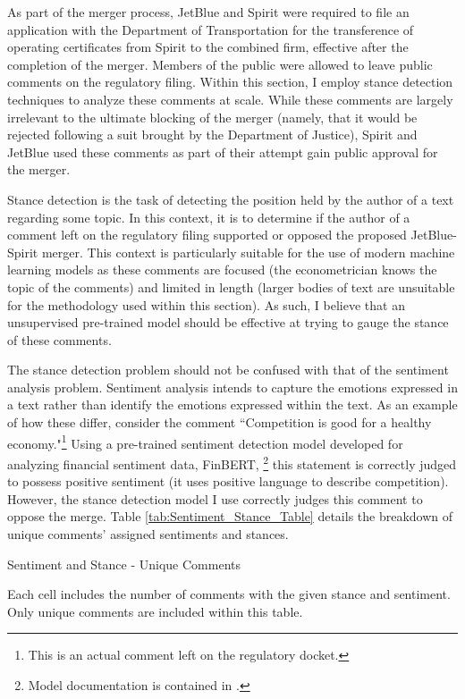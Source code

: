\documentclass{article}
\begin{document}
\begin{appendices}
As part of the merger process, JetBlue and Spirit were required to file an application with the Department of Transportation for the transference of operating certificates from Spirit to the combined firm, effective after the completion of the merger. Members of the public were allowed to leave public comments on the regulatory filing. Within this section, I employ stance detection techniques to analyze these comments at scale. While these comments are largely irrelevant to the ultimate blocking of the merger (namely, that it would be rejected following a suit brought by the Department of Justice), Spirit and JetBlue used these comments as part of their attempt gain public approval for the merger.

Stance detection is the task of detecting the position held by the author of a text regarding some topic. In this context, it is to determine if the author of a comment left on the regulatory filing supported or opposed the proposed JetBlue-Spirit merger. This context is particularly suitable for the use of modern machine learning models as these comments are focused (the econometrician knows the topic of the comments) and limited in length (larger bodies of text are unsuitable for the methodology used within this section). As such, I believe that an unsupervised pre-trained model should be effective at trying to gauge the stance of these comments. 

The stance detection problem should not be confused with that of the sentiment analysis problem. Sentiment analysis intends to capture the emotions expressed in a text rather than identify the emotions expressed within the text. As an example of how these differ, consider the comment ``Competition is good for a healthy economy."\footnote{This is an actual comment left on the regulatory docket.} Using a pre-trained sentiment detection model developed for analyzing financial sentiment data, FinBERT, \footnote{Model documentation is contained in \citet{araci_finbert_2019}.} this statement is correctly judged to possess positive sentiment (it uses positive language to describe competition). However, the stance detection model I use correctly judges this comment to oppose the merge. Table \ref{tab:Sentiment_Stance_Table} details the breakdown of unique comments' assigned sentiments and stances. 

\begin{table}
    \caption{Sentiment and Stance - Unique Comments}
    \label{tab:Sentiment_Stance_Table}
    \vspace{-15mm}
    \begin{center}
    
    \end{center}
        \vspace{-5mm}
    \footnotesize{Each cell includes the number of comments with the given stance and sentiment. Only unique comments are included within this table. }
\end{table}


\end{appendices}
\end{document}
